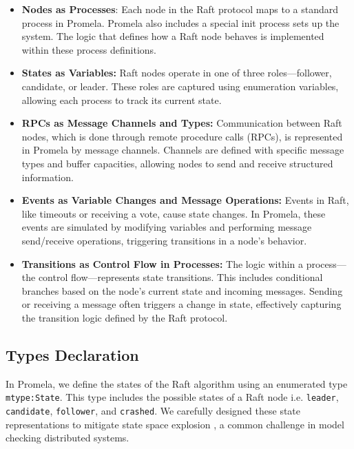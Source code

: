 \documentclass[a4paper]{llncs}
\begin{document}
    \begin{itemize}
        \item \textbf{Nodes as Processes}: Each node in the Raft protocol maps to
            a standard process in Promela. Promela also includes a special init
            process sets up the system. The logic that defines how a Raft node behaves
            is implemented within these process definitions.

        \item \textbf{States as Variables:} Raft nodes operate in one of three
            roles—follower, candidate, or leader. These roles are captured using
            enumeration variables, allowing each process to track its current
            state.

        \item \textbf{RPCs as Message Channels and Types:} Communication between
            Raft nodes, which is done through remote procedure calls (RPCs), is
            represented in Promela by message channels. Channels are defined with
            specific message types and buffer capacities, allowing nodes to send
            and receive structured information.

        \item \textbf{Events as Variable Changes and Message Operations:} Events
            in Raft, like timeouts or receiving a vote, cause state changes. In Promela,
            these events are simulated by modifying variables and performing
            message send/receive operations, triggering transitions in a node's behavior.

        \item \textbf{Transitions as Control Flow in Processes:} The logic
            within a process—the control flow—represents state transitions. This
            includes conditional branches based on the node's current state and incoming
            messages. Sending or receiving a message often triggers a change in
            state, effectively capturing the transition logic defined by the Raft
            protocol.
    \end{itemize}

    \subsection{Types Declaration}
    \label{sec:types_declaration}
    In Promela, we define the states of the Raft algorithm using an enumerated
    type \texttt{mtype:State}. This type includes the possible states of a Raft
    node i.e. \texttt{leader}, \texttt{candidate}, \texttt{follower}, and \texttt{crashed}.
    We carefully designed these state representations to mitigate state space explosion \cite{Godefroid}, a common challenge in model checking distributed systems.
        
\end{document}
